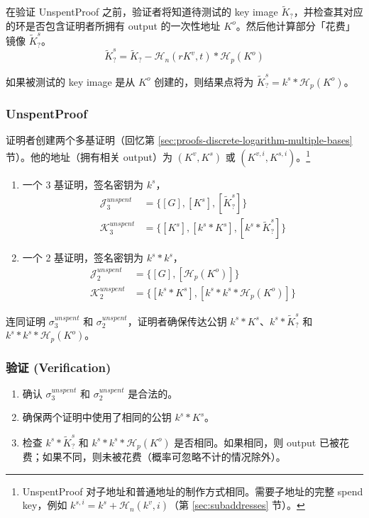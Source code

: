 在验证 UnspentProof 之前，验证者将知道待测试的 key image $\tilde{K}_?$，并检查其对应的环是否包含证明者所拥有 output 的一次性地址 $K^o$。然后他计算部分「花费」镜像 $\tilde{K}^s_?$。\vspace{.175cm}
\[\tilde{K}^s_? = \tilde{K}_? - \mathcal{H}_n(r K^v,t)*\mathcal{H}_p(K^o)\]

如果被测试的 key image 是从 $K^o$ 创建的，则结果点将为 $\tilde{K}^s_? = k^s*\mathcal{H}_p(K^o)$。

\subsubsection*{UnspentProof}

证明者创建两个多基证明（回忆第 \ref{sec:proofs-discrete-logarithm-multiple-bases} 节）。他的地址（拥有相关 output）为 $(K^v, K^s)$ 或 $(K^{v,i}, K^{s,i})$。\footnote{UnspentProof 对子地址和普通地址的制作方式相同。需要子地址的完整 spend key，例如 $k^{s,i} = k^s + \mathcal{H}_n(k^v,i)$（第 \ref{sec:subaddresses} 节）。}

\begin{enumerate}
    \item 一个 3 基证明，签名密钥为 $k^s$，\vspace{.175cm}
    \begin{align*}
        \mathcal{J}^{unspent}_3 &= \{[G], [K^s], [\tilde{K}^s_?]\}\\
        \mathcal{K}^{unspent}_3 &= \{[K^s], [k^s*K^s], [k^s*\tilde{K}^s_?]\}
    \end{align*}{}
    \item 一个 2 基证明，签名密钥为 $k^s*k^s$，\vspace{.175cm}
    \begin{align*}
        \mathcal{J}^{unspent}_2 &= \{[G], [\mathcal{H}_p(K^o)]\}\\
        \mathcal{K}^{unspent}_2 &= \{[k^s*K^s], [k^s*k^s*\mathcal{H}_p(K^o)]\}
    \end{align*}{}
\end{enumerate}{}

连同证明 $\sigma^{unspent}_3$ 和 $\sigma^{unspent}_2$，证明者确保传达公钥 $k^s*K^s$、$k^s*\tilde{K}^s_?$ 和 $k^s*k^s*\mathcal{H}_p(K^o)$。

\subsubsection*{验证 (Verification)}

\begin{enumerate}
    \item 确认 $\sigma^{unspent}_3$ 和 $\sigma^{unspent}_2$ 是合法的。
    \item 确保两个证明中使用了相同的公钥 $k^s*K^s$。
    \item 检查 $k^s*\tilde{K}^s_?$ 和 $k^s*k^s*\mathcal{H}_p(K^o)$ 是否相同。如果相同，则 output 已被花费；如果不同，则未被花费（概率可忽略不计的情况除外）。
\end{enumerate}{}

